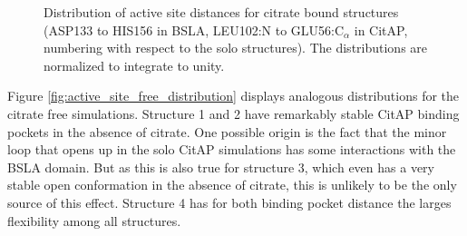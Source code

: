 \documentclass[english, a4paper, 12pt, titlepage, draft]{article}
\begin{document}
\begin{figure}
\begin{minipage}[]{0.45\linewidth}
    \end{minipage}
    \caption{Distribution of active site distances for citrate bound structures (ASP133 to HIS156 in BSLA, LEU102:N to GLU56:C$_{\alpha}$ in CitAP, numbering with respect to the solo structures).
    The distributions are normalized to integrate to unity.}
\label{fig:active_site_bound_distribution}
\end{figure}      



Figure \ref{fig:active_site_free_distribution} displays analogous distributions for the citrate free simulations.
Structure 1 and 2 have remarkably stable CitAP binding pockets in the absence of citrate.
One possible origin is the fact that the minor loop that opens up in the solo CitAP simulations has some interactions with the BSLA domain.
But as this is also true for structure 3, which even has a very stable open conformation in the absence of citrate, this is unlikely to be the only source of this effect.
Structure 4 has for both binding pocket distance the larges flexibility among all structures.
    
\end{document}
